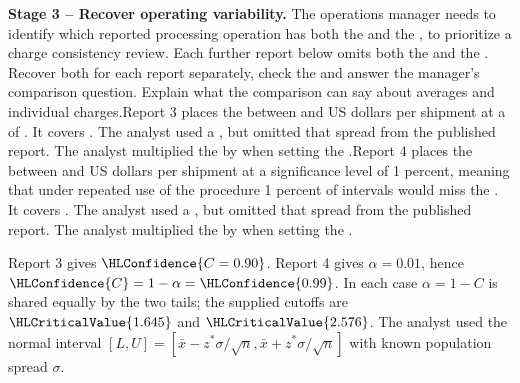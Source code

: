 \textbf{Stage 3 -- Recover operating variability.} The operations manager needs to identify which reported processing operation has both the   and the  , to prioritize a charge consistency review. Each further report below omits both the   and the  . Recover both for each report separately, check the  and answer the manager's comparison question. Explain what the comparison can say about averages and individual charges.\newline Report 3 places the  between  and  US dollars per shipment at a  of . It covers . The analyst used a   , but omitted that spread from the published report. The analyst multiplied the   by  when setting the   .\newline Report 4 places the  between  and  US dollars per shipment at a significance level of 1 percent, meaning that under repeated use of the procedure 1 percent of intervals would miss the . It covers . The analyst used a   , but omitted that spread from the published report. The analyst multiplied the   by  when setting the   .
\par\endgroup

\begingroup
\setlength{\abovedisplayskip}{6pt}
\setlength{\belowdisplayskip}{6pt}
\setlength{\abovedisplayshortskip}{3pt}
\setlength{\belowdisplayshortskip}{4pt}
\setlength{\parskip}{4pt}

Report 3 gives $\HLConfidence{C=0.90}$. Report 4 gives $\alpha=0.01$, hence $\HLConfidence{C}=1-\alpha=\HLConfidence{0.99}$. In each case $\alpha=1-C$ is shared equally by the two tails; the supplied cutoffs are $\HLCriticalValue{1.645}$ and $\HLCriticalValue{2.576}$. The analyst used the normal interval $[L,U]=[\bar x-z^*\sigma/\sqrt n,\bar x+z^*\sigma/\sqrt n]$ with known population spread $\sigma$.

